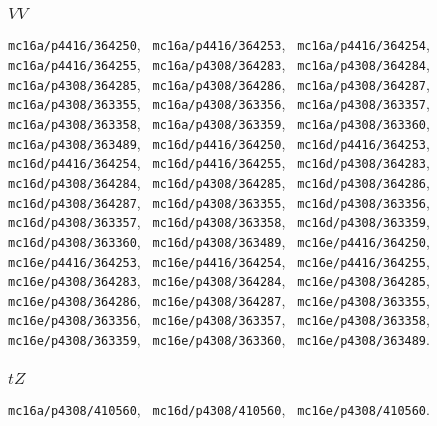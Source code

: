 \subsubsection{$VV$}
\texttt{mc16a/p4416/364250}, \texttt{ mc16a/p4416/364253}, \texttt{ mc16a/p4416/364254},
\newline \texttt{ mc16a/p4416/364255}, \texttt{ mc16a/p4308/364283}, \texttt{ mc16a/p4308/364284},
\newline \texttt{ mc16a/p4308/364285}, \texttt{ mc16a/p4308/364286}, \texttt{ mc16a/p4308/364287},
\newline \texttt{ mc16a/p4308/363355}, \texttt{ mc16a/p4308/363356}, \texttt{ mc16a/p4308/363357},
\newline \texttt{ mc16a/p4308/363358}, \texttt{ mc16a/p4308/363359}, \texttt{ mc16a/p4308/363360},
\newline \texttt{ mc16a/p4308/363489}, \texttt{ mc16d/p4416/364250}, \texttt{ mc16d/p4416/364253},
\newline \texttt{ mc16d/p4416/364254}, \texttt{ mc16d/p4416/364255}, \texttt{ mc16d/p4308/364283},
\newline \texttt{ mc16d/p4308/364284}, \texttt{ mc16d/p4308/364285}, \texttt{ mc16d/p4308/364286},
\newline \texttt{ mc16d/p4308/364287}, \texttt{ mc16d/p4308/363355}, \texttt{ mc16d/p4308/363356},
\newline \texttt{ mc16d/p4308/363357}, \texttt{ mc16d/p4308/363358}, \texttt{ mc16d/p4308/363359},
\newline \texttt{ mc16d/p4308/363360}, \texttt{ mc16d/p4308/363489}, \texttt{ mc16e/p4416/364250},
\newline \texttt{ mc16e/p4416/364253}, \texttt{ mc16e/p4416/364254}, \texttt{ mc16e/p4416/364255},
\newline \texttt{ mc16e/p4308/364283}, \texttt{ mc16e/p4308/364284}, \texttt{ mc16e/p4308/364285},
\newline \texttt{ mc16e/p4308/364286}, \texttt{ mc16e/p4308/364287}, \texttt{ mc16e/p4308/363355},
\newline \texttt{ mc16e/p4308/363356}, \texttt{ mc16e/p4308/363357}, \texttt{ mc16e/p4308/363358},
\newline \texttt{ mc16e/p4308/363359}, \texttt{ mc16e/p4308/363360}, \texttt{ mc16e/p4308/363489}.

\subsubsection{$tZ$}
\texttt{mc16a/p4308/410560}, \texttt{ mc16d/p4308/410560}, \texttt{ mc16e/p4308/410560}.

